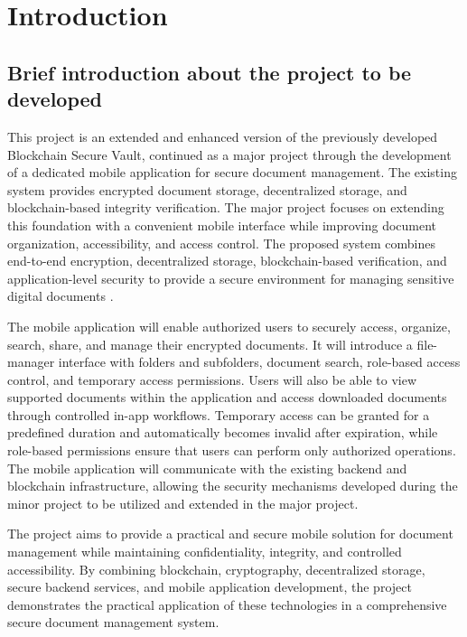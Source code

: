 \documentclass[12pt]{article}
\begin{document}
\newpage
\tableofcontents
\newpage
\listoftables
{}

\clearpage

\listoffigures
{}

\newpage
\section{Introduction}

\subsection{Brief introduction about the project to be developed}

This project is an extended and enhanced version of the previously developed Blockchain Secure Vault, continued as a major project through the development of a dedicated mobile application for secure document management. The existing system provides encrypted document storage, decentralized storage, and blockchain-based integrity verification. The major project focuses on extending this foundation with a convenient mobile interface while improving document organization, accessibility, and access control. The proposed system combines end-to-end encryption, decentralized storage, blockchain-based verification, and application-level security to provide a secure environment for managing sensitive digital documents \cite{stallings2017}.

The mobile application will enable authorized users to securely access, organize, search, share, and manage their encrypted documents. It will introduce a file-manager interface with folders and subfolders, document search, role-based access control, and temporary access permissions. Users will also be able to view supported documents within the application and access downloaded documents through controlled in-app workflows. Temporary access can be granted for a predefined duration and automatically becomes invalid after expiration, while role-based permissions ensure that users can perform only authorized operations. The mobile application will communicate with the existing backend and blockchain infrastructure, allowing the security mechanisms developed during the minor project to be utilized and extended in the major project.

The project aims to provide a practical and secure mobile solution for document management while maintaining confidentiality, integrity, and controlled accessibility. By combining blockchain, cryptography, decentralized storage, secure backend services, and mobile application development, the project demonstrates the practical application of these technologies in a comprehensive secure document management system.
\end{document}
